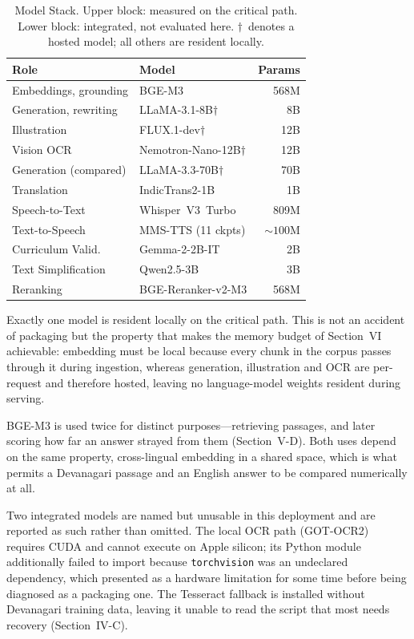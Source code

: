 \documentclass[conference]{IEEEtran}
\begin{document}
\begin{table}[htbp]
\caption{Model Stack. Upper block: measured on the critical path. Lower block: integrated, not evaluated here. $\dagger$~denotes a hosted model; all others are resident locally.}
\label{tab:models}
\centering
\footnotesize
\begin{tabular}{@{}llr@{}}
\toprule
\textbf{Role} & \textbf{Model} & \textbf{Params} \\
\midrule
Embeddings, grounding & BGE-M3 & 568M \\
Generation, rewriting & LLaMA-3.1-8B$\dagger$ & 8B \\
Illustration & FLUX.1-dev$\dagger$ & 12B \\
Vision OCR & Nemotron-Nano-12B$\dagger$ & 12B \\
Generation (compared) & LLaMA-3.3-70B$\dagger$ & 70B \\
\midrule
Translation & IndicTrans2-1B & 1B \\
Speech-to-Text & Whisper~V3~Turbo~\cite{b23} & 809M \\
Text-to-Speech & MMS-TTS (11 ckpts) & ${\sim}100$M \\
Curriculum Valid. & Gemma-2-2B-IT & 2B \\
Text Simplification & Qwen2.5-3B & 3B \\
Reranking & BGE-Reranker-v2-M3 & 568M \\
\bottomrule
\end{tabular}
\end{table}

Exactly one model is resident locally on the critical path. This is not an accident of packaging but the property that makes the memory budget of Section~VI achievable: embedding must be local because every chunk in the corpus passes through it during ingestion, whereas generation, illustration and OCR are per-request and therefore hosted, leaving no language-model weights resident during serving.

BGE-M3 is used twice for distinct purposes---retrieving passages, and later scoring how far an answer strayed from them (Section~V-D). Both uses depend on the same property, cross-lingual embedding in a shared space, which is what permits a Devanagari passage and an English answer to be compared numerically at all.

Two integrated models are named but unusable in this deployment and are reported as such rather than omitted. The local OCR path (GOT-OCR2) requires CUDA and cannot execute on Apple silicon; its Python module additionally failed to import because \texttt{torchvision} was an undeclared dependency, which presented as a hardware limitation for some time before being diagnosed as a packaging one. The Tesseract fallback is installed without Devanagari training data, leaving it unable to read the script that most needs recovery (Section~IV-C).
\end{document}
